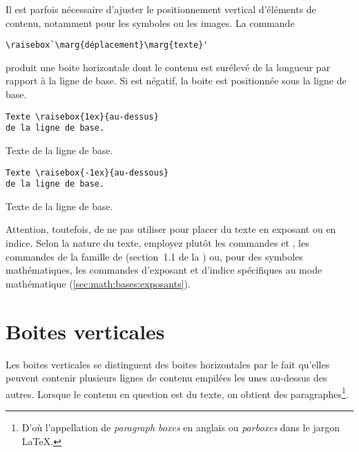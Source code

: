 Il est parfois nécessaire d'ajuster le positionnement vertical
d'éléments de contenu, notamment pour les symboles ou les images. La
commande
\begin{lstlisting}
\raisebox`\marg{déplacement}\marg{texte}'
\end{lstlisting}
produit une boite horizontale dont le contenu  est
surélevé de la longueur  par rapport à la ligne de
base. Si  est négatif, la boite est positionnée sous
la ligne de base.
\begin{demo}
  \begin{texample}[0.55\textwidth]
\begin{lstlisting}
Texte \raisebox{1ex}{au-dessus}
de la ligne de base.
\end{lstlisting}
    \producing
    Texte \raisebox{1ex}{au-dessus}
    de la ligne de base.
  \end{texample}

  \begin{texample}[0.55\textwidth]
\begin{lstlisting}
Texte \raisebox{-1ex}{au-dessous}
de la ligne de base.
\end{lstlisting}
    \producing
    Texte \raisebox{-1ex}{au-dessous}
    de la ligne de base.
  \end{texample}
\end{demo}

Attention, toutefois, de ne pas utiliser \cmd{\raisebox} pour placer
du texte en exposant ou en indice. Selon la nature du texte, employez
plutôt les commandes \cmd{\textsuperscript} et \cmd{\textsubscript},
les commandes de la famille \cmd{\ieme} de  (section~1.1 de
la %
) ou, pour des
symboles mathématiques, les commandes d'exposant et d'indice
spécifiques au mode mathématique (\autoref{sec:math:bases:exposants}).

\section{Boites verticales}
\label{sec:boites:parbox}

Les boites verticales se distinguent des boites horizontales par le
fait qu'elles peuvent contenir plusieurs lignes de contenu empilées
les unes au-dessus des autres. Lorsque le contenu en question est du
texte, on obtient des paragraphes\footnote{%
  D'où l'appellation de \emph{paragraph boxes} en anglais
  ou \emph{parboxes} dans le jargon {\LaTeX}.}. %

